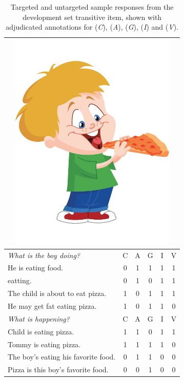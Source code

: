 \begin{table}[htb!]
\begin{center}
\begin{tabular}{|l|c|c|c|c|c|}
\hline
\multicolumn{6}{|c|}{\includegraphics[width=0.45\columnwidth]{figures/I02.jpg}} \\
\hline
\textit{What is the boy doing?} & C & A & G & I & V \\
\hline
\hline
He is eating food. & 0 & 1 & 1 & 1 & 1 \\
\hline
eatting. & 0 & 1 & 0 & 1 & 1 \\
\hline
The child is about to eat pizza. & 1 & 0 & 1 & 1 & 1 \\
\hline
He may get fat eating pizza. & 1 & 0 & 1 & 1 & 0 \\
\hline
\hline
\hline
\textit{What is happening?} & C & A & G & I & V \\
\hline
\hline
Child is eating pizza. & 1 & 1 & 0 & 1 & 1 \\
\hline
Tommy is eating pizza. & 1 & 1 & 1 & 1 & 0 \\
\hline
The boy's eating his favorite food. & 0 & 1 & 1 & 0 & 0 \\
\hline
Pizza is this boy's favorite food. & 0 & 0 & 1 & 0 & 0 \\
\hline
\end{tabular}
\caption{\label{tab:dev-transitive} Targeted and untargeted sample responses from the development set transitive item, shown with adjudicated annotations for  (\textit{C}),  (\textit{A}),  (\textit{G}),  (\textit{I}) and  (\textit{V}).}
\end{center}
\end{table}

